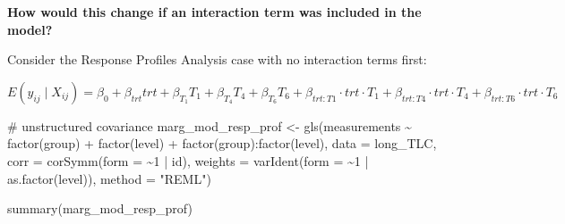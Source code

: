 \documentclass[
  letterpaper,
  DIV=11,
  numbers=noendperiod]{scrreprt}
\newenvironment{Shaded}{\begin{snugshade}}{\end{snugshade}}
\newcommand{\AttributeTok}[1]{\textcolor[rgb]{0.40,0.45,0.13}{#1}}
\newcommand{\CommentTok}[1]{\textcolor[rgb]{0.37,0.37,0.37}{#1}}
\newcommand{\DecValTok}[1]{\textcolor[rgb]{0.68,0.00,0.00}{#1}}
\newcommand{\FunctionTok}[1]{\textcolor[rgb]{0.28,0.35,0.67}{#1}}
\newcommand{\NormalTok}[1]{\textcolor[rgb]{0.00,0.23,0.31}{#1}}
\newcommand{\OtherTok}[1]{\textcolor[rgb]{0.00,0.23,0.31}{#1}}
\newcommand{\SpecialCharTok}[1]{\textcolor[rgb]{0.37,0.37,0.37}{#1}}
\newcommand{\StringTok}[1]{\textcolor[rgb]{0.13,0.47,0.30}{#1}}
\begin{document}
\textbf{How would this change if an interaction term was included in the
model?}

Consider the Response Profiles Analysis case with no interaction terms
first:

\begin{center}
$E(y_{ij} \mid X_{ij}) = \beta_0 +  \beta_{trt}trt +  \beta_{T_1}T_1 +  \beta_{T_4}T_4 +  \beta_{T_6}T_6 + \beta_{trt:T1}\cdot trt \cdot T_1 +  \beta_{trt:T4}\cdot trt \cdot T_4 +  \beta_{trt:T6}\cdot trt \cdot T_6$
\end{center}

\begin{Shaded}
\begin{Highlighting}[]
\CommentTok{\# unstructured covariance}
\NormalTok{marg\_mod\_resp\_prof }\OtherTok{\textless{}{-}} \FunctionTok{gls}\NormalTok{(measurements }\SpecialCharTok{\textasciitilde{}} \FunctionTok{factor}\NormalTok{(group) }\SpecialCharTok{+} \FunctionTok{factor}\NormalTok{(level) }\SpecialCharTok{+} \FunctionTok{factor}\NormalTok{(group)}\SpecialCharTok{:}\FunctionTok{factor}\NormalTok{(level),}
    \AttributeTok{data =}\NormalTok{ long\_TLC, }\AttributeTok{corr =} \FunctionTok{corSymm}\NormalTok{(}\AttributeTok{form =} \SpecialCharTok{\textasciitilde{}}\DecValTok{1} \SpecialCharTok{|}\NormalTok{ id), }\AttributeTok{weights =} \FunctionTok{varIdent}\NormalTok{(}\AttributeTok{form =} \SpecialCharTok{\textasciitilde{}}\DecValTok{1} \SpecialCharTok{|}
        \FunctionTok{as.factor}\NormalTok{(level)), }\AttributeTok{method =} \StringTok{"REML"}\NormalTok{)}

\FunctionTok{summary}\NormalTok{(marg\_mod\_resp\_prof)}
\end{Highlighting}
\end{Shaded}
\end{document}
